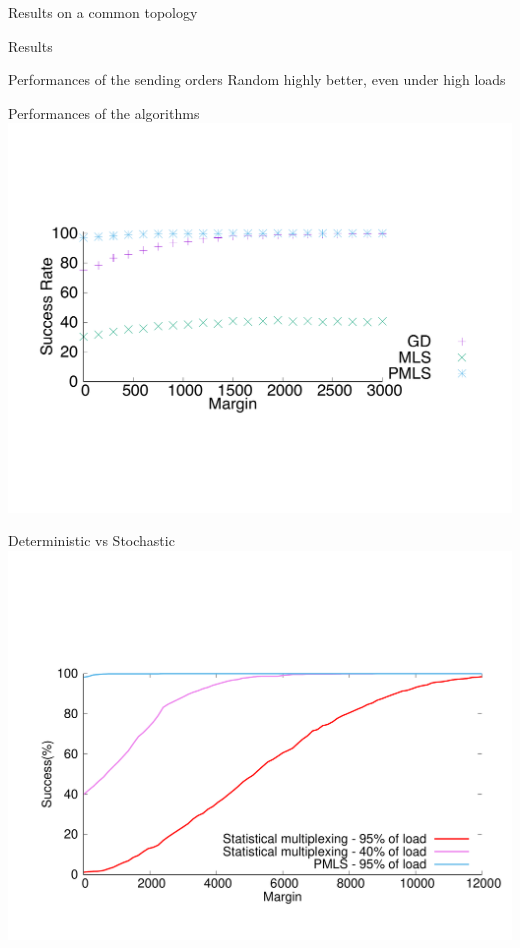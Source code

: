 \documentclass[10 pt]{beamer}
\begin{document}
\begin{section}{Results on a common topology}
\begin{subsection}{Results}
\begin{frame}{Performances of the sending orders}
  Random highly better, even under high loads
  \end{frame}
  \begin{frame}{Performances of the algorithms}
\centering
  \includegraphics[scale=0.5]{retour_21000.pdf}\\
  \end{frame}
  
    \begin{frame}{Deterministic vs Stochastic}
\centering
\vspace{-2cm}
  \includegraphics[scale=0.4]{stochastic.pdf}\\
  \end{frame}
\end{subsection}

\end{section}
\end{document}
